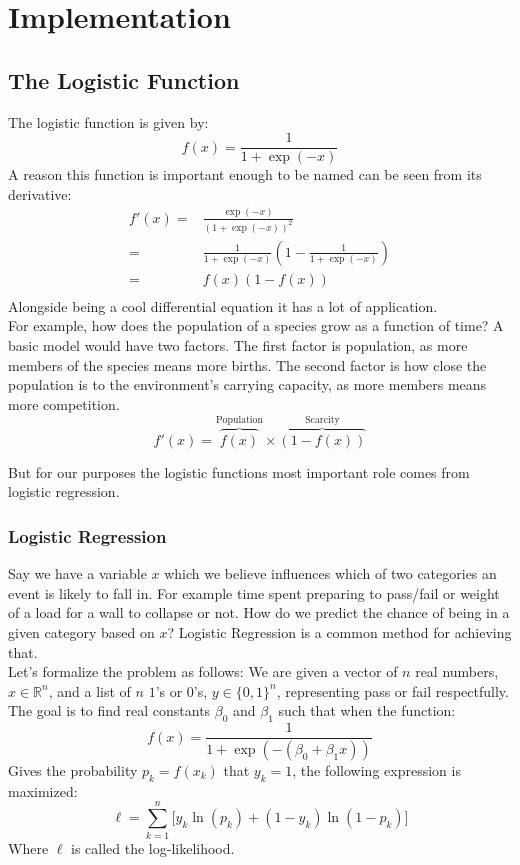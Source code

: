
\chapter{Implementation}

\section{The Logistic Function}
The logistic function is given by:
\[
f(x) = \frac{1}{1+\exp(-x)}
\]
A reason this function is important enough to be named can be seen from its derivative:
\begin{equation*}
\begin{aligned}
	f'(x) =& \frac{\exp(-x)}{(1+\exp(-x))^2}\\
	=& \frac{1}{1+\exp(-x)}\left(1-\frac{1}{1+\exp(-x)}\right)\\
	=& f(x)(1-f(x)) \\
\end{aligned}
\end{equation*}
Alongside being a cool differential equation it has a lot of application.
\\

For example, 
how does the population of a species grow as a function of time?
A basic model would have two factors.
The first factor is population,
as more members of the species means more births.
The second factor is how close the population is to the environment's carrying capacity,
as more members means more competition. 
\[
f'(x) = \overbrace{f(x)}^\text{Population}\times\overbrace{(1-f(x))}^\text{Scarcity}
\]

But for our purposes the logistic functions most important role comes from logistic regression.

\subsection{Logistic Regression}
Say we have a variable $x$ which we believe influences which of two categories an event is likely to fall in.
For example time spent preparing to pass/fail or weight of a load for a wall to collapse or not.
How do we predict the chance of being in a given category based on $x$?
Logistic Regression is a common method for achieving that.
\\

Let's formalize the problem as follows:
We are given a vector of $n$ real numbers, $x\in \mathbb{R}^n$, and a list of $n$ $1$'s or $0$'s, $y\in \{0,1\}^n$,
representing pass or fail respectfully.
The goal is to find real constants $\beta_0$ and $\beta_1$ such that when the function:
\[
	f(x) = \frac{1}{1+\exp(-(\beta_0+\beta_1 x))}
\]
Gives the probability $p_k = f(x_k)$ that $y_k=1$,
the following expression is maximized:
\[
	\ell = \sum_{k=1}^n\big[y_k\ln(p_k)+(1-y_k)\ln(1-p_k)\big]
\]
Where $\ell$ is called the log-likelihood.

